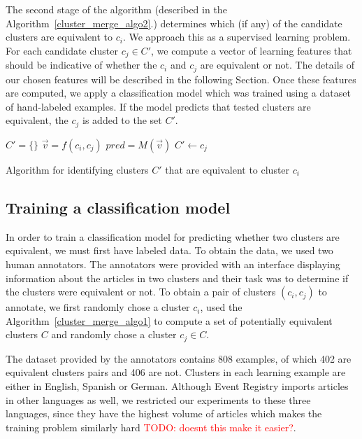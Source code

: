 \documentclass[twoside,11pt]{article}
\newcommand{\todo}[1]{\textcolor{red}{TODO: #1}}
\begin{document}
The second stage of the algorithm (described in the Algorithm~\ref{cluster_merge_algo2}.) determines which (if any) of the candidate clusters are equivalent to $c_i$. We approach this as a supervised learning problem. For each candidate cluster $c_j \in C'$, we compute a vector of learning features that should be indicative of whether the $c_i$ and $c_j$ are equivalent or not. The details of our chosen features will be described in the following Section. Once these features are computed, we apply a classification model which was trained using a  dataset  of hand-labeled examples. If the model predicts that tested clusters are equivalent, the $c_j$ is added to the set $C'$.

\begin{algorithm}[tb!]

$C' = \{\}$\;
 {
    $\vec{v} = f(c_i, c_j)$\;
    $pred = M(\vec{v})$\;
     {
        $C' \leftarrow c_j$
    }
}
\caption{Algorithm for identifying clusters $C'$ that are equivalent to cluster $c_i$}
\label{cluster_merge_algo2}
\end{algorithm}

\subsection{Training a classification model}

In order to train a classification model for predicting whether two clusters are equivalent, we must first have labeled data. To obtain the data, we used two human annotators. The annotators were provided with an interface displaying information about the articles in two clusters and their task was to determine if the clusters were equivalent or not. To obtain a pair of clusters $(c_i, c_j)$ to annotate, we first randomly chose a cluster $c_i$, used the Algorithm~\ref{cluster_merge_algo1} to compute a set of potentially equivalent clusters $C$ and randomly chose a cluster $c_j \in C$.

The dataset provided by the annotators contains 808 examples, of which 402 are equivalent clusters pairs and 406 are not. Clusters in each learning example are either in English, Spanish or German. Although Event Registry imports articles in other languages as well, we restricted our experiments to these three languages, since they have the highest volume of articles which makes the training problem similarly hard \todo{doesnt this make it easier?}.
\end{document}
